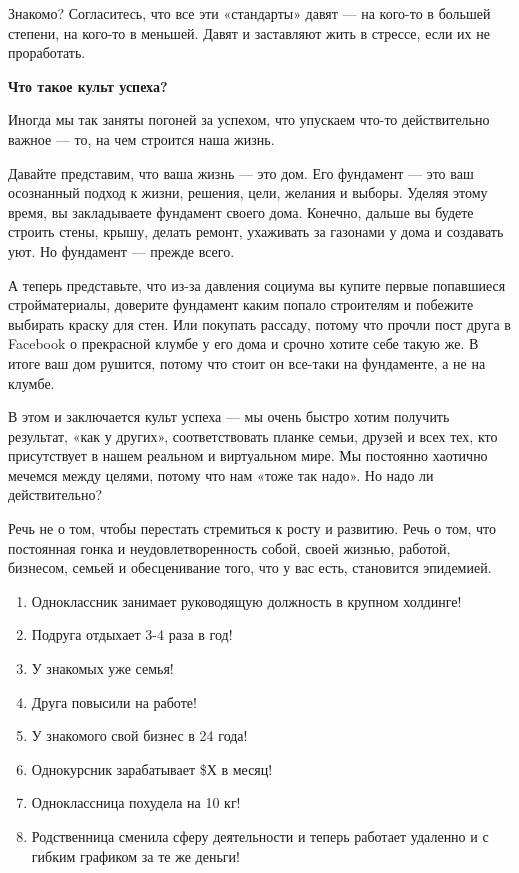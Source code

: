 Знакомо? Согласитесь, что все эти «стандарты» давят — на кого-то в большей степени, на кого-то в меньшей. Давят и заставляют жить в стрессе, если их не проработать.

\textbf{Что такое культ успеха?}

Иногда мы так заняты погоней за успехом, что упускаем что-то действительно важное — то, на чем строится наша жизнь.

Давайте представим, что ваша жизнь — это дом. Его фундамент — это ваш осознанный подход к жизни, решения, цели, желания и выборы. Уделяя этому время, вы закладываете фундамент своего дома. Конечно, дальше вы будете строить стены, крышу, делать ремонт, ухаживать за газонами у дома и создавать уют. Но фундамент — прежде всего.

А теперь представьте, что из-за давления социума вы купите первые попавшиеся стройматериалы, доверите фундамент каким попало строителям и побежите выбирать краску для стен. Или покупать рассаду, потому что прочли пост друга в Facebook о прекрасной клумбе у его дома и срочно хотите себе такую же. В итоге ваш дом рушится, потому что стоит он все-таки на фундаменте, а не на клумбе.

В этом и заключается культ успеха — мы очень быстро хотим получить результат, «как у других», соответствовать планке семьи, друзей и всех тех, кто присутствует в нашем реальном и виртуальном мире. Мы постоянно хаотично мечемся между целями, потому что нам «тоже так надо». Но надо ли действительно?

Речь не о том, чтобы перестать стремиться к росту и развитию. Речь о том, что постоянная гонка и неудовлетворенность собой, своей жизнью, работой, бизнесом, семьей и обесценивание того, что у вас есть, становится эпидемией.

\begin{enumerate}
    \item Одноклассник занимает руководящую должность в крупном холдинге!
    \item Подруга отдыхает 3-4 раза в год!
    \item У знакомых уже семья!
    \item Друга повысили на работе!
    \item У знакомого свой бизнес в 24 года!
    \item Однокурсник зарабатывает \$Х в месяц!
    \item Одноклассница похудела на 10 кг!
    \item Родственница сменила сферу деятельности и теперь работает удаленно и с гибким графиком за те же деньги!
\end{enumerate}

